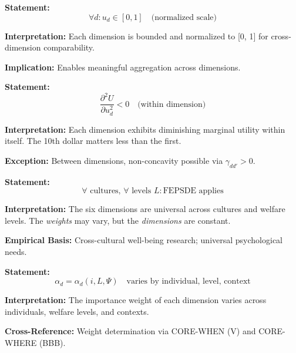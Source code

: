 \begin{tcolorbox}[colback=gray!5!white, colframe=gray!75!black,
    title=Axiom DIM-3: Boundedness]
\textbf{Statement:}
\begin{equation}
\forall d: u_d \in [0, 1] \quad \text{(normalized scale)}
\end{equation}

\textbf{Interpretation:} Each dimension is bounded and normalized to [0, 1]
for cross-dimension comparability.

\textbf{Implication:} Enables meaningful aggregation across dimensions.
\end{tcolorbox}

\begin{tcolorbox}[colback=gray!5!white, colframe=gray!75!black,
    title=Axiom DIM-4: Diminishing Marginal Utility]
\textbf{Statement:}
\begin{equation}
\frac{\partial^2 U}{\partial u_d^2} < 0 \quad \text{(within dimension)}
\end{equation}

\textbf{Interpretation:} Each dimension exhibits diminishing marginal utility
within itself. The 10th dollar matters less than the first.

\textbf{Exception:} Between dimensions, non-concavity possible via $\gamma_{dd'} > 0$.
\end{tcolorbox}

\begin{tcolorbox}[colback=gray!5!white, colframe=gray!75!black,
    title=Axiom DIM-5: Universal Presence]
\textbf{Statement:}
\begin{equation}
\forall \text{ cultures, } \forall \text{ levels } L: \text{FEPSDE applies}
\end{equation}

\textbf{Interpretation:} The six dimensions are universal across cultures and
welfare levels. The \textit{weights} may vary, but the \textit{dimensions} are constant.

\textbf{Empirical Basis:} Cross-cultural well-being research; universal psychological needs.
\end{tcolorbox}

\begin{tcolorbox}[colback=gray!5!white, colframe=gray!75!black,
    title=Axiom DIM-6: Weight Heterogeneity]
\textbf{Statement:}
\begin{equation}
\alpha_d = \alpha_d(i, L, \Psi) \quad \text{varies by individual, level, context}
\end{equation}

\textbf{Interpretation:} The importance weight of each dimension varies across
individuals, welfare levels, and contexts.

\textbf{Cross-Reference:} Weight determination via CORE-WHEN (V) and CORE-WHERE (BBB).
\end{tcolorbox}

